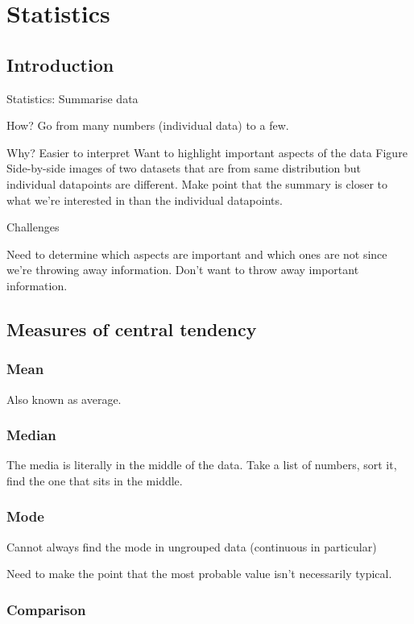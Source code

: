\documentclass[a4paper,11pt]{report}
\begin{document}
\chapter{Statistics}

\section{Introduction}

Statistics: Summarise data

How?
  Go from many numbers (individual data) to a few.

Why?
  Easier to interpret
  Want to highlight important aspects of the data
  Figure
     Side-by-side images of two datasets that are from same
     distribution but individual datapoints are different. Make point
     that the summary is closer to what we're interested in than the
     individual datapoints.

Challenges

  Need to determine which aspects are important and which ones are not
  since we're throwing away information. Don't want to throw away
  important information.

\section{Measures of central tendency}

\subsection{Mean}

Also known as average. 

\subsection{Median}

The media is literally in the middle of the data. Take a list of
numbers, sort it, find the one that sits in the middle.

\subsection{Mode}
Cannot always find the mode in ungrouped data (continuous in particular)

Need to make the point that the most probable value isn't necessarily
typical.

\subsection{Comparison}
\end{document}
